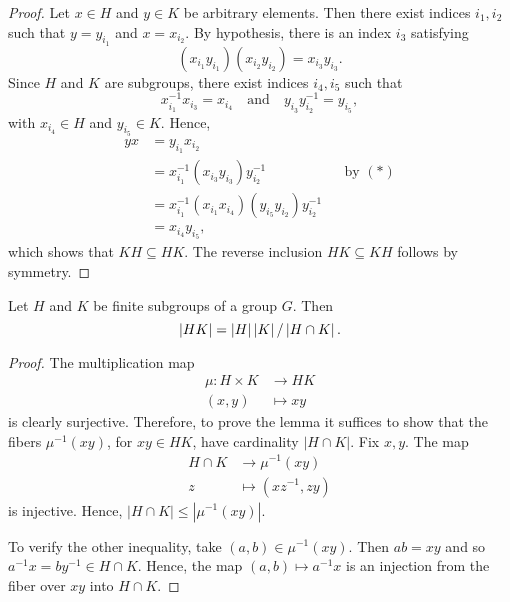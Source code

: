 \begin{proof}
    Let $x\in H$ and $y\in K$ be arbitrary elements. Then there exist indices $i_1,i_2$ such that $y=y_{i_1}$ and $x=x_{i_2}$. By hypothesis, there is an index $i_3$ satisfying
    \[
        (x_{i_1}y_{i_1})(x_{i_2}y_{i_2})=x_{i_3}y_{i_3}.\tag{$\ast$}
    \]
    Since $H$ and $K$ are subgroups, there exist indices $i_4,i_5$ such that
    \[
        x_{i_1}^{-1}x_{i_3}=x_{i_4}
        \quad\text{and}\quad
        y_{i_3}y_{i_2}^{-1}=y_{i_5},
    \]
    with $x_{i_4}\in H$ and $y_{i_5}\in K$. Hence,
    \begin{align*}
        yx
            &= y_{i_1}x_{i_2}\\
            &= x_{i_1}^{-1}(x_{i_3}y_{i_3})y_{i_2}^{-1}
                &&\text{by }(\ast)\\
            &= x_{i_1}^{-1}(x_{i_1}x_{i_4})(y_{i_5}y_{i_2})y_{i_2}^{-1}\\
            &= x_{i_4}y_{i_5},
    \end{align*}
    which shows that $KH\subseteq HK$. The reverse inclusion $HK\subseteq KH$ follows by symmetry.
\end{proof}




\begin{lem}\label{lem:HK-cardinality}
    Let $H$ and $K$ be finite subgroups of a group $G$. Then
    $$
        \left\vert{HK}\right\vert = \left\vert{H}\right\vert \left\vert{K}\right\vert / \left\vert{H\cap K}\right\vert.
    $$
\end{lem}

\begin{proof}
    The multiplication map
    \begin{align*}
        \mu\colon H\times K&\to HK\\
        (x,y)&\mapsto xy
    \end{align*}
    is clearly surjective. Therefore, to prove the lemma it suffices to show that the fibers $\mu^{-1}(xy)$, for $xy\in HK$, have cardinality $|H\cap K|$. Fix $x,y$. The map
    \begin{align*}
        H\cap K&\to\mu^{-1}(xy)\\
        z&\mapsto (xz^{-1},zy)
    \end{align*}
    is injective. Hence, $|H\cap K|\le|\mu^{-1}(xy)|$.

    To verify the other inequality, take $(a,b)\in\mu^{-1}(xy)$. Then $ab=xy$ and so $a^{-1}x=by^{-1}\in H\cap K$. Hence, the map $(a,b)\mapsto a^{-1}x$ is an injection from the fiber over $xy$ into $H\cap K$.
\end{proof}

